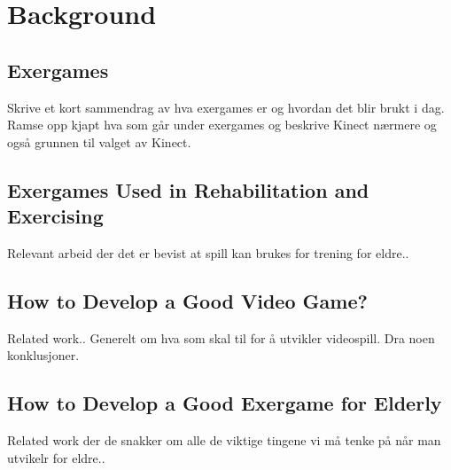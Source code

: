 \chapter{Background}
\section{Exergames}
Skrive et kort sammendrag av hva exergames er og hvordan det blir brukt i dag. Ramse opp kjapt hva som går under exergames og beskrive Kinect nærmere og også grunnen til valget av Kinect. 
\section{Exergames Used in Rehabilitation and Exercising}
Relevant arbeid der det er bevist at spill kan brukes for trening for eldre.. 
\section{How to Develop a Good Video Game?}
Related work.. Generelt om hva som skal til for å utvikler videospill. Dra noen konklusjoner.
\section{How to Develop a Good Exergame for Elderly}
Related work der de snakker om alle de viktige tingene vi må tenke på når man utvikelr for eldre..

